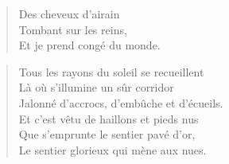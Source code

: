 \begin{verse}\haikuII
  Des cheveux d’airain\\  %
  Tombant sur les reins,\\  %
  Et je prend congé du monde. %
\end{verse}


\begin{verse}\sizain
  Tous les rayons du soleil se recueillent\\ 
  Là où s’illumine un sûr corridor\\ 
  Jalonné d’accrocs, d’embûche et d’écueils.\\ 
  Et c’est vêtu de haillons et pieds nus\\ 
  Que s’emprunte le sentier pavé d’or,\\ 
  Le sentier glorieux qui mène aux nues. %
\end{verse}

